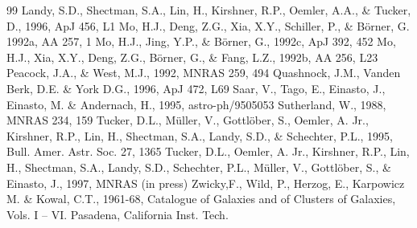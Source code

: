 \begin{thebibliography}{99}
  Landy, S.D., Shectman, S.A., Lin, H., Kirshner, R.P., Oemler,
A.A., \& Tucker, D., 1996, ApJ 456, L1 
 Mo, H.J., Deng, Z.G., Xia, X.Y., Schiller, P., \&
 B\"orner, G.  1992a, AA 257, 1
 Mo, H.J., Jing, Y.P., \& B\"orner, G., 1992c, ApJ 392, 452 
 Mo, H.J., Xia, X.Y., Deng, Z.G., B\"orner, G., \& Fang,
L.Z., 1992b, AA 256, L23
 Peacock, J.A., \& West, M.J., 1992, MNRAS 259, 494
 Quashnock, J.M., Vanden Berk, D.E. \& York D.G., 1996,
ApJ 472, L69
 Saar, V., Tago, E., Einasto, J., Einasto, M. \& Andernach,
H., 1995,  astro-ph/9505053
 Sutherland, W., 1988, MNRAS 234, 159
 Tucker, D.L., M\"uller, V., Gottl\"ober, S., Oemler, A. Jr., 
Kirshner, R.P., Lin, H., Shectman, S.A., Landy, S.D., \& Schechter, P.L., 1995,
Bull. Amer. Astr. Soc. 27, 1365 
 Tucker, D.L., Oemler, A. Jr., Kirshner, R.P., Lin, H., 
Shectman, S.A., Landy, S.D., Schechter, P.L., M\"uller, V., 
Gottl\"ober, S., \& Einasto, J., 1997, MNRAS (in press)
 Zwicky,F., Wild, P., Herzog, E., Karpowicz M. \& Kowal,
C.T., 1961-68,  Catalogue of Galaxies and of Clusters of
Galaxies, Vols. I -- VI. Pasadena, California Inst. Tech.

\end{thebibliography}












